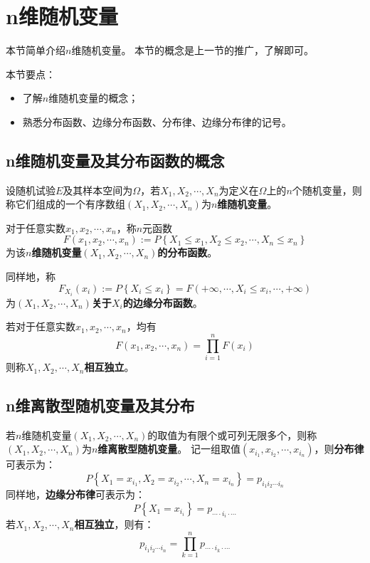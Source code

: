 \section{n维随机变量}

本节简单介绍$n$维随机变量。
本节的概念是上一节的推广，了解即可。

本节要点：
\begin{itemize}
    \item 了解$n$维随机变量的概念；
    \item 熟悉分布函数、边缘分布函数、分布律、边缘分布律的记号。
\end{itemize}

\subsection{n维随机变量及其分布函数的概念}

\begin{definition}
设随机试验$E$及其样本空间为$\varOmega $，若$X_1,X_2,\cdots ,X_n$为定义在$\varOmega $上的$n$个随机变量，则称它们组成的一个有序数组$\left( X_1,X_2,\cdots ,X_n \right) $为{\bf $n$维随机变量}。

对于任意实数$x_1,x_2,\cdots ,x_n$，称$n$元函数
\[
F\left( x_1,x_2,\cdots ,x_n \right) :=P\left\{ X_1\leqslant x_1,X_2\leqslant x_2,\cdots ,X_n\leqslant x_n \right\}
\]
为该{\bf $n$维随机变量$\left( X_1,X_2,\cdots ,X_n \right) $的分布函数}。

同样地，称
\[
F_{X_i}\left( x_i \right) :=P\left\{ X_i\leqslant x_i \right\} =F\left( +\infty ,\cdots ,X_i\leqslant x_i,\cdots ,+\infty \right)
\]
为{\bf $\left( X_1,X_2,\cdots ,X_n \right) $关于$X_i$的边缘分布函数}。

若对于任意实数$x_1,x_2,\cdots ,x_n$，均有
\[
F\left( x_1,x_2,\cdots ,x_n \right) =\prod_{i=1}^n{F\left( x_i \right)}
\]
则称{\bf $X_1,X_2,\cdots ,X_n$相互独立}。
\end{definition}

\subsection{n维离散型随机变量及其分布}

\begin{definition}
若$n$维随机变量$\left( X_1,X_2,\cdots ,X_n \right) $的取值为有限个或可列无限多个，则称$\left( X_1,X_2,\cdots ,X_n \right) $为{\bf $n$维离散型随机变量}。
记一组取值$\left( x_{i_1},x_{i_2},\cdots ,x_{i_n} \right) $，则{\bf 分布律}可表示为：
\[
P\left\{ X_1=x_{i_1},X_2=x_{i_2},\cdots ,X_n=x_{i_n} \right\} =p_{i_1i_2\cdots i_n}
\]
同样地，{\bf 边缘分布律}可表示为：
\[
P\left\{ X_1=x_{i_i} \right\} =p_{\cdots \cdot i_i\cdot \cdots}
\]
若{\bf $X_1,X_2,\cdots ,X_n$相互独立}，则有：
\[
p_{i_1i_2\cdots i_n}=\prod_{k=1}^n{p_{\cdots \cdot i_k\cdot \cdots}}
\]
\end{definition}

